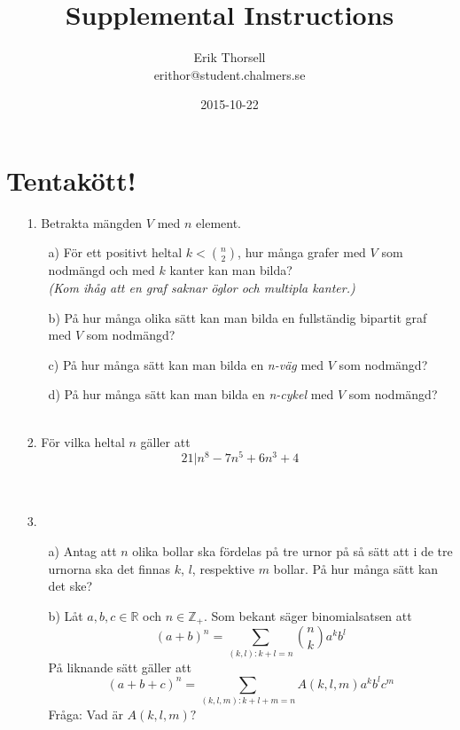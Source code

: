 \documentclass{article}
\title{Supplemental Instructions}
\author{Erik Thorsell \\ 
		\small{erithor@student.chalmers.se}
}
\date{2015-10-22}
\begin{document}
\maketitle

\section*{Tentakött!}

\begin{enumerate}

\item[1.]
Betrakta mängden $V$ med $n$ element.
\begin{itemize}
    \item[a)] För ett positivt heltal $k < \binom{n}{2}$, hur många grafer med 
              $V$ som nodmängd och med $k$ kanter kan man bilda?\\
              {\it (Kom ihåg att en graf saknar öglor och multipla kanter.)}
    \item[b)] På hur många olika sätt kan man bilda en fullständig bipartit 
              graf med $V$ som nodmängd?
    \item[c)] På hur många sätt kan man bilda en {\it n-väg} med $V$ som 
              nodmängd?
    \item[d)] På hur många sätt kan man bilda en {\it n-cykel} med $V$ som 
              nodmängd?\\\\
\end{itemize}

\item[2.]
    För vilka heltal $n$ gäller att $$21|n^8 - 7n^5 + 6n^3 + 4$$\\\\

\item[3.]
\begin{itemize}
    \item[a)] Antag att $n$ olika bollar ska fördelas på tre urnor på så sätt 
              att i de tre urnorna ska det finnas $k$, $l$, respektive $m$ 
              bollar. På hur många sätt kan det ske?
    \item[b)] Låt $a,b,c \in \mathbb{R}$ och $n \in \mathbb{Z}_{+}$. Som 
              bekant säger binomialsatsen att $$(a+b)^n = \sum_{(k,l):k+l=n} 
              \binom{n}{k}a^kb^l$$
              På liknande sätt gäller att $$(a+b+c)^n = \sum_{(k,l,m):k+l+m=n} 
              A(k,l,m)a^kb^lc^m$$
              Fråga: Vad är $A(k,l,m)?$\\\\
\end{itemize}


\end{enumerate}
\end{document}
